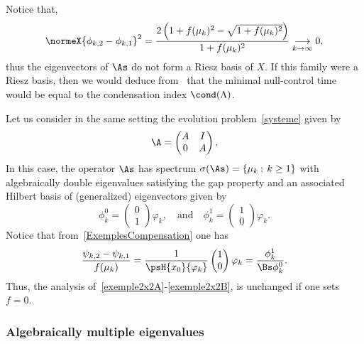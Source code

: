 \begin{rema}
Notice that,
\begin{equation*}\label{ExAcademique1:EstimeeDifferenceVectProp}
\normeX{ \phi_{k,2} - \phi_{k,1} }^2 = \frac{2 \left(1+ f(\mu_k)^2 - \sqrt{1+f(\mu_k)^2} \right)}{1+ f(\mu_k)^2} \underset{k \to \infty}{\longrightarrow} 0,
\end{equation*}
thus the eigenvectors of $\As$ do not form a Riesz basis of $X$. If this family were a Riesz basis, then we would deduce from~\cite{AmmarKhodjaBenabdallahGonzalez-BurgosdeTeresa:2014} that the minimal null-control time would be equal to the condensation index $\cond(\Lambda)$.
\end{rema}

\begin{rema} \label{Rem:SystLimite}
Let us consider in the same setting the evolution problem~\eqref{systeme} given by
\begin{equation*}\label{exempleA}
\A=
\begin{pmatrix} A & I \\ 0 & A
\end{pmatrix}.
\end{equation*}
In this case, the operator $\As$ has spectrum $ \sigma(\As)=\{ \mu_k \: ; \: k \geq 1\}$ with algebraically double eigenvalues satisfying the gap property and an associated Hilbert basis of (generalized) eigenvectors given by
\[
\phi_k^0=
\begin{pmatrix} 0 \\ 1
\end{pmatrix} \varphi_k,
\quad \text{and} \quad
\phi_k^1=
\begin{pmatrix} 1 \\ 0
\end{pmatrix} \varphi_k.
\]
Notice that from~\eqref{ExemplesCompensation} one has
\[
\frac{\psi_{k,2}- \psi_{k,1}}{f(\mu_k)} = \frac{1}{\psH{x_0}{\varphi_k}}
\begin{pmatrix} 1 \\ 0
\end{pmatrix} \varphi_k = \frac{\phi_k^1}{\Bs \phi_k^0}.
\]
Thus, the analysis of~\eqref{exemple2x2A}-\eqref{exemple2x2B}, is unchanged if one sets $f=0$.
\end{rema}



\subsubsection{Algebraically multiple eigenvalues}\label{secexample3x2+1}

